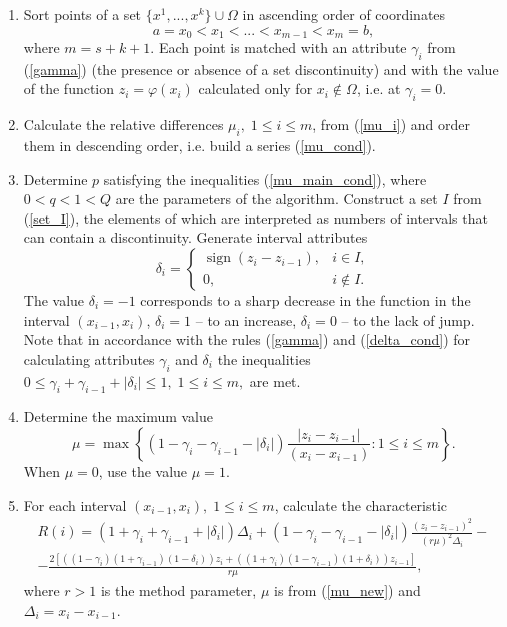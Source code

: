 \documentclass[runningheads]{llncs}
\newcommand{\sign}{\operatorname{sign}}
\begin{document}
\begin{enumerate}
\item Sort points of a set $\{x^1,...,x^k\} \cup \Omega$ in ascending order of coordinates 
\begin{equation}\label{x_cond}
 a=x_0<x_1<...<x_{m-1}<x_m=b,
\end{equation}
where $m=s+k+1$. Each point is matched with an attribute $\gamma_i$ from (\ref{gamma}) (the presence or absence of a set discontinuity) and with the value of the function $z_i=\varphi(x_i)$ calculated only for $x_i \not\in \Omega$, i.e. at $\gamma_i=0$.

\item Calculate the relative differences $\mu_i, \; 1 \leq i \leq m$, from (\ref{mu_i}) and order them in descending order, i.e. build a series (\ref{mu_cond}).

\item Determine $p$ satisfying the inequalities (\ref{mu_main_cond}), where $0<q<1<Q$ are the parameters of the algorithm. Construct a set $I$ from (\ref{set_I}), the elements of which are interpreted as numbers of intervals that can contain a discontinuity. Generate interval attributes
\begin{equation}\label{delta_cond}
\delta_i=
\begin{cases}
	\sign{(z_i - z_{i-1})}, &\text{$i \in I$}, \\
	0, &\text{$i \not \in I$}.
\end{cases}
\end{equation}
The value $\delta_i=-1$ corresponds to a sharp decrease in the function in the interval $(x_{i-1},x_i)$, $\delta_i=1$ -- to an increase, $\delta_i=0$ -- to the lack of jump. Note that in accordance with the rules (\ref{gamma}) and (\ref{delta_cond}) for calculating attributes $\gamma_i$ and $\delta_i$ the inequalities
$ 0 \leq \gamma_i+\gamma_{i-1}+|\delta_i | \leq 1, \; 1 \leq i \leq m, $
are met.

\item Determine the maximum value
\begin{equation}\label{mu_new}
\mu=\max\left\{\left(1-\gamma_i-\gamma_{i-1}-|\delta_i|\right) \frac {|z_i-z_{i-1}|}{(x_i-x_{i-1})}: 1 \leq i \leq m\right\}.
\end{equation}
When $\mu=0$, use the value $\mu=1$.

\item For each interval $(x_{i-1},x_i), \; 1 \leq i \leq m$, calculate the characteristic
\[
\begin{gathered}
R(i)=(1+\gamma_i+\gamma_{i-1}+|\delta_i |) \Delta_i+(1-\gamma_i-\gamma_{i-1}-|\delta_i |)\frac{(z_i-z_{i-1} )^2}{(r\mu)^2 \Delta_i } - \\
- \frac{2[((1-\gamma_i )(1+\gamma_{i-1} )(1-\delta_i )) z_i+((1+\gamma_i )(1-\gamma_{i-1} )(1+\delta_i )) z_{i-1} ]}{r\mu},
\end{gathered}
\]
where $r > 1$ is the method parameter, $\mu$ is from (\ref{mu_new}) and $\Delta_i=x_i-x_{i-1}$.


\end{enumerate}
\end{document}
